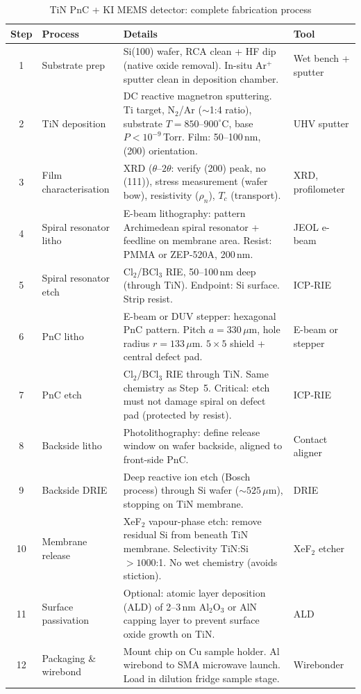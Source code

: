 \documentclass[11pt]{article}
\theoremstyle{remark}
\begin{document}
\begin{table}[H]
\centering
\caption{TiN PnC + KI MEMS detector: complete fabrication process}
\label{tab:process}
\begin{tabular}{@{}clp{5.5cm}l@{}}
\toprule
Step & Process & Details & Tool \\
\midrule
1 & Substrate prep & Si(100) wafer, RCA clean + HF dip
    (native oxide removal). In-situ Ar$^+$ sputter clean
    in deposition chamber. & Wet bench + sputter \\
2 & TiN deposition & DC reactive magnetron sputtering.
    Ti target, N$_2$/Ar ($\sim$1:4 ratio), substrate
    $T = 850$--$900^\circ$C, base $P < 10^{-9}$\,Torr.
    Film: 50--100\,nm, (200) orientation. & UHV sputter \\
3 & Film characterisation & XRD ($\theta$--$2\theta$: verify
    (200) peak, no (111)), stress measurement (wafer bow),
    resistivity ($\rho_n$), $T_c$ (transport). & XRD, profilometer \\
4 & Spiral resonator litho & E-beam lithography: pattern
    Archimedean spiral resonator + feedline on membrane
    area. Resist: PMMA or ZEP-520A, 200\,nm. & JEOL e-beam \\
5 & Spiral resonator etch & Cl$_2$/BCl$_3$ RIE, 50--100\,nm
    deep (through TiN). Endpoint: Si surface. Strip resist. & ICP-RIE \\
6 & PnC litho & E-beam or DUV stepper: hexagonal PnC pattern.
    Pitch $a = 330\,\mu$m, hole radius $r = 133\,\mu$m.
    $5 \times 5$ shield + central defect pad. & E-beam or stepper \\
7 & PnC etch & Cl$_2$/BCl$_3$ RIE through TiN. Same chemistry
    as Step~5. Critical: etch must not damage spiral on
    defect pad (protected by resist). & ICP-RIE \\
8 & Backside litho & Photolithography: define release window
    on wafer backside, aligned to front-side PnC. & Contact aligner \\
9 & Backside DRIE & Deep reactive ion etch (Bosch process) through
    Si wafer ($\sim 525\,\mu$m), stopping on TiN membrane. & DRIE \\
10 & Membrane release & XeF$_2$ vapour-phase etch: remove residual
     Si from beneath TiN membrane. Selectivity TiN:Si $> 1000$:1.
     No wet chemistry (avoids stiction). & XeF$_2$ etcher \\
11 & Surface passivation & Optional: atomic layer deposition (ALD)
     of 2--3\,nm Al$_2$O$_3$ or AlN capping layer to prevent
     surface oxide growth on TiN. & ALD \\
12 & Packaging \& wirebond & Mount chip on Cu sample holder.
     Al wirebond to SMA microwave launch. Load in dilution
     fridge sample stage. & Wirebonder \\
\bottomrule
\end{tabular}
\end{table}
\end{document}
